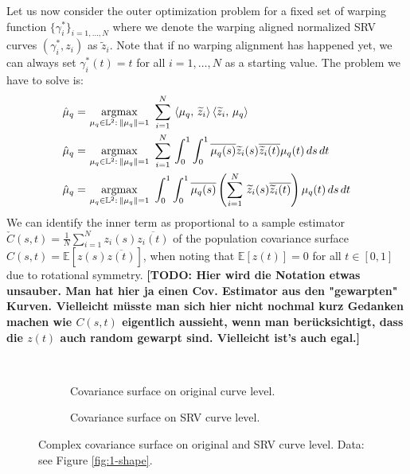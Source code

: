 Let us now consider the outer optimization problem for a fixed set of warping function $\{\gamma_i^*\}_{i=1,\dots,N}$ where we denote the warping aligned normalized SRV curves $(\gamma_i^*, z_i)$ as $\widetilde{z}_i$.
Note that if no warping alignment has happened yet, we can always set $\gamma_i^*(t) = t$ for all $i=1,\dots,N$ as a starting value.
The problem we have to solve is:
\begin{align*}
  \hat\mu_q = &\, \operatorname*{argmax}_{\mu_q \in \mathbb{L}^2:\,\lVert\mu_q\rVert = 1}\,\,
    \sum_{i=1}^N \, \left\langle \mu_q,\, \widetilde z_i \right\rangle \left\langle \widetilde z_i,\, \mu_q \right\rangle \\
  \hat\mu_q = &\, \operatorname*{argmax}_{\mu_q \in \mathbb{L}^2:\,\lVert\mu_q\rVert = 1}\,\,
    \sum_{i=1}^N \, \int_0^1 \int_0^1 \overline{\mu_q (s)} \widetilde z_i(s) \overline{\widetilde z_i(t)} \mu_q(t) \,ds\,dt \\
  \hat\mu_q = &\, \operatorname*{argmax}_{\mu_q \in \mathbb{L}^2:\,\lVert\mu_q\rVert = 1}\,\,
    \int_0^1 \int_0^1 \overline{\mu_q (s)} \left( \sum_{i=1}^N\, \widetilde z_i(s) \overline{ \widetilde z_i(t)} \right) \mu_q(t) \,ds\,dt
\end{align*}
We can identify the inner term as proportional to a sample estimator $\check{C}(s,t) = \frac{1}{N} \sum_{i=1}^N z_i(s) \overline{z_i(t)}$ of the population covariance surface $C(s,t) = \mathbb{E}[z(s) \overline{z(t)}]$, when noting that $\mathbb{E}[z(t)] = 0$ for all $t \in [0,1]$ due to rotational symmetry.
\textbf{[TODO: Hier wird die Notation etwas unsauber. Man hat hier ja einen Cov. Estimator aus den "gewarpten" Kurven. Vielleicht müsste man sich hier nicht nochmal kurz Gedanken machen wie $C(s,t)$ eigentlich aussieht, wenn man berücksichtigt, dass die $z(t)$ auch random gewarpt sind. Vielleicht ist's auch egal.]}

\begin{figure}
  \centering
  \begin{subfigure}{.48\textwidth}
    \centering
  \end{subfigure}\hfill%
  \begin{subfigure}{.48\textwidth}
    \centering
  \end{subfigure}\\
  \begin{subfigure}{.48\textwidth}
    \centering
    \caption{Covariance surface on original curve level.}
  \end{subfigure}\hfill%
  \begin{subfigure}{.48\textwidth}
    \centering
    \caption{Covariance surface on SRV curve level.}
  \end{subfigure}
  \caption{Complex covariance surface on original and SRV curve level. Data: see Figure \ref{fig:1-shape}.}
  \label{fig:2-cov}
\end{figure}

